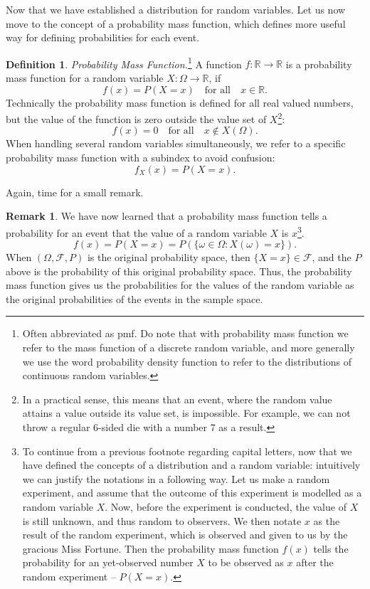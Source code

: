 \documentclass[12pt,a4paper,leqno]{report}
\newcommand{\R}{\mathbb{R}}
\newcommand{\F}{\mathcal{F}}
\theoremstyle{plain}
\theoremstyle{definition}
\newtheorem{maar}[equation]{Definition}
\newtheorem{remark}[equation]{Remark}
\begin{document}
Now that we have established a distribution for random variables. Let us now move to the concept of a probability mass function, which defines more useful way for defining probabilities for each event.

\begin{maar}
\emph{Probability Mass Function.}\footnote{Often abbreviated as pmf. Do note that with probability mass function we refer to the mass function of a discrete random variable, and more generally we use the word probability density function to refer to the distributions of continuous random variables.}   A function $f:\R \rightarrow \R$ is a probability mass function for a random variable $X: \Omega \rightarrow \R$, if
\[
f(x) = P(X =x)  \quad \text{for all} \quad x \in \R.
\]
Technically the probability mass function is defined for all real valued numbers, but the value of the function is zero outside the value set of $X$\footnote{In a practical sense, this means that an event, where the random value attains a value outside its value set, is impossible. For example, we can not throw a regular 6-sided die with a number 7 as a result.}:
\[
f(x) = 0 \quad \text{for all} \quad x \notin X(\Omega).
\]
When handling several random variables simultaneously, we refer to a specific probability mass function with a subindex to avoid confusion:
\[
f_X(x) = P(X=x).
\]
\end{maar} 

Again, time for a small remark.

\begin{remark}
We have now learned that a probability mass function tells a probability for an event that the value of a random variable $X$ is $x$\footnote{To continue from a previous footnote regarding capital letters, now that we have defined the concepts of a distribution and a random variable: intuitively we can justify the notations in a following way. Let us make a random experiment, and assume that the outcome of this experiment is modelled as a random variable $X$. Now, before the experiment is conducted, the value of $X$ is still unknown, and thus random to observers. We then notate $x$ as the result of the random experiment, which is observed and given to us by the gracious Miss Fortune. Then the probability mass function $f(x)$ tells the probability for an yet-observed number $X$ to be observed as $x$ after the random experiment -- $P(X=x)$.}.
\[
f(x) = P(X =x)  = P(\{\omega \in \Omega : X(\omega) = x\}).
\]
When $(\Omega, \F, P)$ is the original probability space, then $\{X=x\} \in \F$, and the $P$ above is the probability of this original probability space. Thus, the probability mass function gives us the probabilities for the values of the random variable as the original probabilities of the events in the sample space. 
\end{remark}
\end{document}
